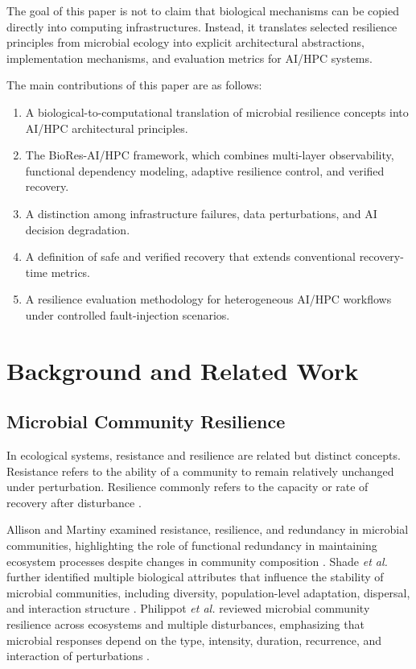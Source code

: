 \documentclass[conference]{IEEEtran}
\begin{document}
The goal of this paper is not to claim that biological mechanisms can be copied directly into computing infrastructures. Instead, it translates selected resilience principles from microbial ecology into explicit architectural abstractions, implementation mechanisms, and evaluation metrics for AI/HPC systems.

The main contributions of this paper are as follows:
\begin{enumerate}
    \item A biological-to-computational translation of microbial resilience concepts into AI/HPC architectural principles.
    \item The BioRes-AI/HPC framework, which combines multi-layer observability, functional dependency modeling, adaptive resilience control, and verified recovery.
    \item A distinction among infrastructure failures, data perturbations, and AI decision degradation.
    \item A definition of safe and verified recovery that extends conventional recovery-time metrics.
    \item A resilience evaluation methodology for heterogeneous AI/HPC workflows under controlled fault-injection scenarios.
\end{enumerate}

\section{Background and Related Work}

\subsection{Microbial Community Resilience}

In ecological systems, resistance and resilience are related but distinct concepts. Resistance refers to the ability of a community to remain relatively unchanged under perturbation. Resilience commonly refers to the capacity or rate of recovery after disturbance \cite{allison2008,shade2012}.

Allison and Martiny examined resistance, resilience, and redundancy in microbial communities, highlighting the role of functional redundancy in maintaining ecosystem processes despite changes in community composition \cite{allison2008}. Shade \emph{et al.} further identified multiple biological attributes that influence the stability of microbial communities, including diversity, population-level adaptation, dispersal, and interaction structure \cite{shade2012}. Philippot \emph{et al.} reviewed microbial community resilience across ecosystems and multiple disturbances, emphasizing that microbial responses depend on the type, intensity, duration, recurrence, and interaction of perturbations \cite{philippot2021}.
\end{document}
